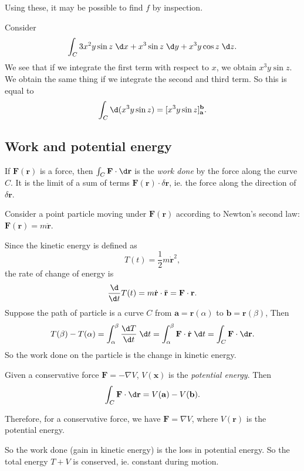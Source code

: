 \documentclass[a4paper]{article}
\begin{document}
Using these, it may be possible to find $f$ by inspection.

\begin{eg}
  Consider
  \[
    \int_C 3x^2 y\sin z\;\d x + x^3 \sin z \;\d y + x^3 y\cos z\;\d z.
  \]
  We see that if we integrate the first term with respect to $x$, we obtain $x^3 y\sin z$. We obtain the same thing if we integrate the second and third term. So this is equal to
  \[
    \int_C \d (x^3 y \sin z) = [x^3 y\sin z]^{\mathbf{b}}_{\mathbf{a}}.
  \]
\end{eg}

\subsection{Work and potential energy}
\begin{defi}
  If $\mathbf{F}(\mathbf{r})$ is a force, then $\int_C \mathbf{F}\cdot \d \mathbf{r}$ is the \emph{work done} by the force along the curve $C$. It is the limit of a sum of terms $\mathbf{F}(\mathbf{r})\cdot \delta \mathbf{r}$, ie. the force along the direction of $\delta \mathbf{r}$.
\end{defi}

Consider a point particle moving under $\mathbf{F}(\mathbf{r})$ according to Newton's second law: $\mathbf{F}(\mathbf{r}) = m\ddot{\mathbf{r}}$.

Since the kinetic energy is defined as
\[
  T(t) = \frac{1}{2}m\dot{\mathbf{r}}^2,
\]
the rate of change of energy is
\[
  \frac{\d}{\d t}T(t) = m\dot{\mathbf{r}}\cdot \ddot{\mathbf{r}} = \mathbf{F}\cdot \mathbf{r}.
\]
Suppose the path of particle is a curve $C$ from $\mathbf{a} = \mathbf{r}(\alpha)$ to $\mathbf{b} = \mathbf{r}(\beta)$, Then
\[
  T(\beta) - T(\alpha) = \int_\alpha^\beta \frac{\d T}{\d t} \;\d t = \int_\alpha^\beta \mathbf{F}\cdot \dot{\mathbf{r}}\;\d t = \int_C \mathbf{F}\cdot \d \mathbf{r}.
\]
So the work done on the particle is the change in kinetic energy.

\begin{defi}
  Given a conservative force $\mathbf{F} = -\nabla V$, $V(\mathbf{x})$ is the \emph{potential energy}. Then
  \[
    \int_C  \mathbf{F}\cdot \d \mathbf{r} = V(\mathbf{a}) - V(\mathbf{b}).
  \]
\end{defi}
Therefore, for a conservative force, we have $\mathbf{F} = \nabla V$, where $V(\mathbf{r})$ is the potential energy.

So the work done (gain in kinetic energy) is the loss in potential energy. So the total energy $T + V$ is conserved, ie. constant during motion.
\end{document}
